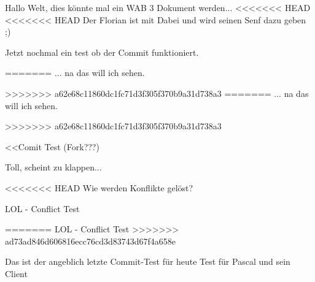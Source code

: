 \documentclass[a4paper,12pt]{scrreprt}
\begin{document}
Hallo Welt, dies könnte mal ein WAB 3 Dokument werden...
<<<<<<< HEAD
<<<<<<< HEAD
Der Florian ist mit Dabei und wird seinen Senf dazu geben ;)

Jetzt nochmal ein test ob der Commit funktioniert.

=======
... na das will ich sehen.

>>>>>>> a62e68c11860dc1fc71d3f305f370b9a31d738a3
=======
... na das will ich sehen.

>>>>>>> a62e68c11860dc1fc71d3f305f370b9a31d738a3

<<Comit Test (Fork???)

Toll, scheint zu klappen...

<<<<<<< HEAD
Wie werden Konflikte gelöst?

LOL - Conflict Test

=======
LOL - Conflict Test
>>>>>>> ad73ad846d606816ecc76cd3d83743d67f4a658e

Das ist der angeblich letzte Commit-Test für heute
Test für Pascal und sein Client
\end{document}
